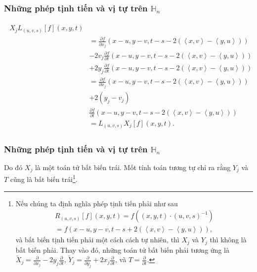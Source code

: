 \documentclass[11pt]{beamer}
\numberwithin{equation}{section}
\theoremstyle{plain}
\theoremstyle{definition}
\theoremstyle{remark}
\begin{document}
\begin{frame}\frametitle{Những phép tịnh tiến và vị tự trên $\mathbb{H}_{n}$}
\begin{eqnarray*}
\begin{split}
{X_j}{L_{\left( {u,v,s} \right)}}\left[ f \right]\left( {x,y,t} \right)\\
 &= \frac{{\partial f}}{{\partial {x_j}}}\left( {x - u,y - v,t - s - 2\left( {\left\langle {x,v} \right\rangle  - \left\langle {y,u} \right\rangle } \right)} \right)\\
 &- 2{v_j}\frac{{\partial f}}{{\partial t}}\left( {x - u,y - v,t - s - 2\left( {\left\langle {x,v} \right\rangle  - \left\langle {y,u} \right\rangle } \right)} \right)\\
 &+ 2{y_j}\frac{{\partial f}}{{\partial t}}\left( {x - u,y - v,t - s - 2\left( {\left\langle {x,v} \right\rangle  - \left\langle {y,u} \right\rangle } \right)} \right)\\
& = \frac{{\partial f}}{{\partial {x_j}}}\left( {x - u,y - v,t - s - 2\left( {\left\langle {x,v} \right\rangle  - \left\langle {y,u} \right\rangle } \right)} \right)\\
 &+ 2\left( {{y_j} - {v_j}} \right)\\
 &\frac{{\partial f}}{{\partial t}}\left( {x - u,y - v,t - s - 2\left( {\left\langle {x,v} \right\rangle  - \left\langle {y,u} \right\rangle } \right)} \right)\\
 &= {L_{\left( {u,v,s} \right)}}{X_j}\left[ f \right]\left( {x,y,t} \right).
\end{split}
\end{eqnarray*}
\end{frame}
\begin{frame}\frametitle{Những phép tịnh tiến và vị tự trên $\mathbb{H}_{n}$}
Do đó $X_{j}$ là một toán tử bất biến trái. Mốt tính toán tương tự chỉ ra rằng $Y_{j}$ và $T$ cũng là bất biến trái\footnote{Nếu chúng ta định nghĩa phép tịnh tiến phải như sau
\[\begin{array}{l}
{R_{\left( {u,v,s} \right)}}\left[ f \right]\left( {x,y,t} \right) = f\left( {\left( {x,y,t} \right) \cdot {{\left( {u,v,s} \right)}^{ - 1}}} \right)\\
 = f\left( {x - u,y - v,t - s + 2\left( {\left\langle {x,v} \right\rangle  - \left\langle {y,u} \right\rangle } \right)} \right),
\end{array}\]
và bất biến tịnh tiến phải một cách cách tự nhiên, thì $X_{j}$ và $Y_{j}$ thì không là bất biến phải. Thay vào đó, những toán tử bất biến phải tương ứng là 
${\widetilde X_j} = \frac{\partial }{{\partial {x_j}}} - 2{y_j}\frac{\partial }{{\partial t}}$, ${\widetilde Y_j} = \frac{\partial }{{\partial {y_j}}} + 2{x_j}\frac{\partial }{{\partial t}}$, và $T = \frac{\partial }{{\partial t}}$.}.
\end{frame}
\end{document}
